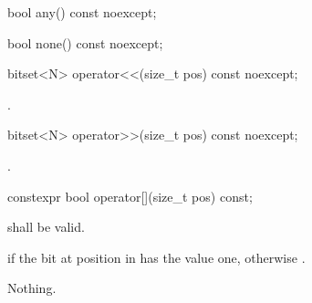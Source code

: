 \begin{itemdescr}
\pnum
\returns {}
\end{itemdescr}

%
\begin{itemdecl}
bool any() const noexcept;
\end{itemdecl}

\begin{itemdescr}
\pnum
\returns {}
\end{itemdescr}

%
\begin{itemdecl}
bool none() const noexcept;
\end{itemdecl}

\begin{itemdescr}
\pnum
\returns {}
\end{itemdescr}

%
\begin{itemdecl}
bitset<N> operator<<(size_t pos) const noexcept;
\end{itemdecl}

\begin{itemdescr}
\pnum
\returns
{}.
\end{itemdescr}

%
\begin{itemdecl}
bitset<N> operator>>(size_t pos) const noexcept;
\end{itemdecl}

\begin{itemdescr}
\pnum
\returns
{}.
\end{itemdescr}

\begin{itemdecl}
constexpr bool operator[](size_t pos) const;
\end{itemdecl}

\begin{itemdescr}
\pnum
\requires
{} shall be valid.

\pnum
\returns
{} if the bit at position  in  has the value
one, otherwise .

\pnum
\throws Nothing.
\end{itemdescr}


